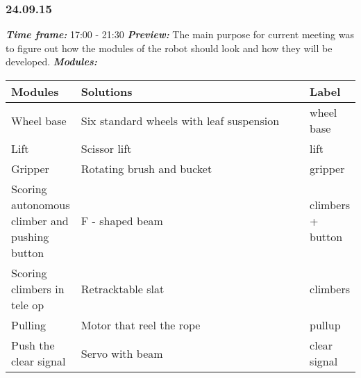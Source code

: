 
\subsubsection{24.09.15}
\textit{\textbf{Time frame:}} 17:00 - 21:30 \newline
\textit{\textbf{Preview:}} The main purpose for current meeting was to figure out how the modules of the robot should look and how they will be developed. \newline \newline
\textit{\textbf{Modules:}}

\begin{table}[H]
	\vspace{-2mm}
	\begin{center}
		\begin{tabular}{|p{0.2\linewidth}|p{0.7\linewidth}|p{0.1\linewidth}|}
			\hline
			Modules & Solutions & Label \\
			\hline
			Wheel base & Six standard wheels with leaf suspension & wheel base \\
			\hline
			Lift & Scissor lift & lift \\
			\hline
			Gripper & Rotating brush and bucket & gripper\\
			\hline
			Scoring autonomous climber and pushing button & F - shaped beam & climbers + button\\
			\hline
			Scoring climbers in tele op & Retracktable slat & climbers\\
			\hline
			Pulling & Motor that reel the rope & pullup\\
			\hline
			Push the clear signal & Servo with beam & clear signal\\
			\hline
		\end{tabular}
	\end{center}
\end{table}


